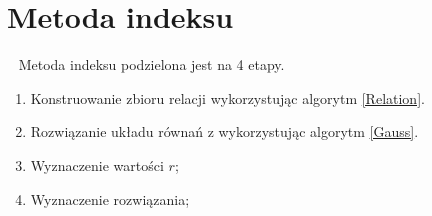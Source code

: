 \documentclass[]{article}
\begin{document}
\section{Metoda indeksu}~
	Metoda indeksu podzielona jest na 4 etapy. 
	\begin{enumerate}
		\item Konstruowanie zbioru relacji wykorzystując algorytm \ref{Relation}.
		\item Rozwiązanie układu równań z wykorzystując algorytm \ref{Gauss}.
		\item Wyznaczenie wartości \(r\);
		\item Wyznaczenie rozwiązania;
	\end{enumerate}
\end{document}
